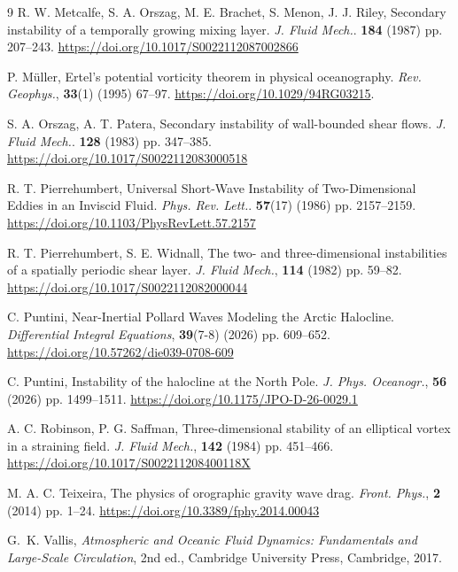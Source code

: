 \documentclass[reqno]{amsart}
\begin{document}
\begin{thebibliography}{9}
R. W. Metcalfe, S. A. Orszag, M. E. Brachet, S. Menon, J. J. Riley, Secondary instability of a temporally growing mixing layer. \textit{J. Fluid Mech.}. {\bf 184} (1987) pp. 207--243.
 \url{https://doi.org/10.1017/S0022112087002866}




P. Müller, Ertel's potential vorticity theorem in physical oceanography.
\textit{Rev. Geophys.}, \textbf{33}(1) (1995) 67--97.
\url{https://doi.org/10.1029/94RG03215}.


S. A. Orszag, A. T. Patera,  Secondary instability of wall-bounded shear flows. \textit{J. Fluid Mech.}. {\bf 128} (1983) pp. 347--385.
 \url{https://doi.org/10.1017/S0022112083000518}



R. T. Pierrehumbert, Universal Short-Wave Instability of Two-Dimensional Eddies in an Inviscid Fluid. \textit{Phys. Rev. Lett.}. {\bf 57}(17) (1986) pp. 2157--2159.
 \url{https://doi.org/10.1103/PhysRevLett.57.2157}

R. T. Pierrehumbert, S. E. Widnall, The two- and three-dimensional instabilities of a spatially periodic shear layer. \textit{J. Fluid Mech.}, {\bf 114} (1982) pp. 59--82.
 \url{https://doi.org/10.1017/S0022112082000044}





{C. Puntini}, Near-Inertial Pollard Waves Modeling the Arctic Halocline. \textit{Differential Integral Equations}, {\bf 39}(7-8) (2026) pp. 609--652.
 \url{https://doi.org/10.57262/die039-0708-609}



C. Puntini,  Instability of the halocline at the {N}orth {P}ole. \textit{J. Phys. Oceanogr.}, {\bf 56} (2026) pp. 1499--1511. \url{https://doi.org/10.1175/JPO-D-26-0029.1}



A. C. Robinson, P. G. Saffman, Three-dimensional stability of an elliptical vortex in a straining field. \textit{J. Fluid Mech.}, {\bf 142} (1984) pp. 451--466.
 \url{https://doi.org/10.1017/S002211208400118X}

M. A. C. Teixeira, The physics of orographic gravity wave drag. \textit{Front. Phys.}, {\bf 2} (2014) pp. 1--24.
 \url{https://doi.org/10.3389/fphy.2014.00043}

G.~K. Vallis,
\textit{Atmospheric and Oceanic Fluid Dynamics: Fundamentals and Large-Scale Circulation},
2nd ed., Cambridge University Press, Cambridge, 2017.


\end{thebibliography}
\end{document}
